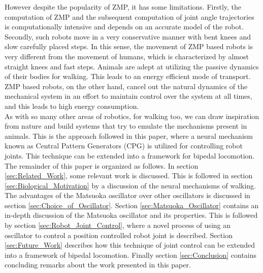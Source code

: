\documentclass[12pt,twoside]{article}
\theoremstyle{plain}
\theoremstyle{definition}
\theoremstyle{remark}
\newcommand{\forceindent}{\leavevmode{\parindent=2em\indent}}
\begin{document}
\forceindent However despite the popularity of ZMP, it has some limitations. Firstly, the computation of ZMP and the subsequent computation of joint angle trajectories is computationally intensive and depends on an accurate model of the robot. Secondly, such robots move in a very conservative manner with bent knees and slow carefully placed steps. In this sense, the movement of ZMP based robots is very different from the movement of humans, which is characterized by almost straight knees and fast steps. Animals are adept at utilizing the passive dynamics of their bodies for walking. This leads to an energy efficient mode of transport. ZMP based robots, on the other hand, cancel out the natural dynamics of the mechanical system in an effort to maintain control over the system at all times, and this leads to high energy consumption.\\
\forceindent As with so many other areas of robotics, for walking too, we can draw inspiration from nature and build systems that try to emulate the mechanisms present in animals. This is the approach followed in this paper, where a neural mechanism known as Central Pattern Generators (CPG) is utilized for controlling robot joints. This technique can be extended into a framework for bipedal locomotion. The remainder of this paper is organized as follows. In section \ref{sec:Related_Work}, some relevant work is discussed. This is followed in section \ref{sec:Biological_Motivation} by a discussion of the neural mechanisms of walking. The advantages of the Matsuoka oscillator over other oscillators is discussed in section \ref{sec:Choice_of_Oscillator}.  Section \ref{sec:Matsuoka_Oscillator} contains an in-depth discussion of the Matsuoka oscillator and its properties. This is followed by section \ref{sec:Robot_Joint_Control}, where a novel process of using an oscillator to control a position controlled robot joint is described. Section \ref{sec:Future_Work} describes how this technique of joint control can be extended into a framework of bipedal locomotion. Finally section \ref{sec:Conclusion} contains concluding remarks about the work presented in this paper.
\end{document}
